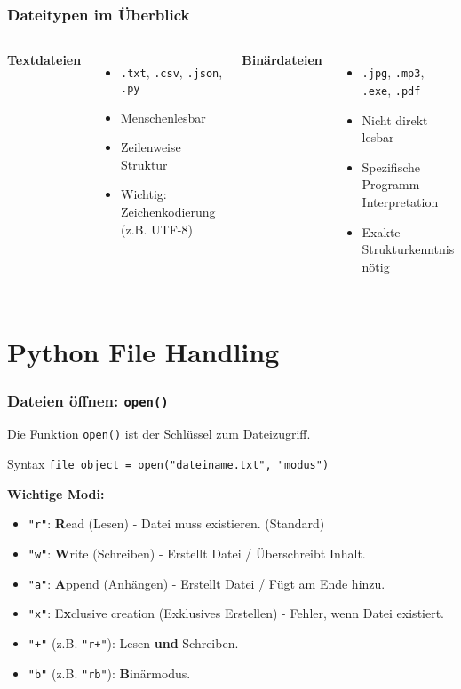 \documentclass[aspectratio=169]{beamer} %
\begin{document}
\begin{frame}[fragile]
\frametitle{Dateitypen im Überblick}
\begin{columns}[T] %
    \textbf{Textdateien}
    \begin{itemize}
        \item \texttt{.txt}, \texttt{.csv}, \texttt{.json}, \texttt{.py}
        \item Menschenlesbar
        \item Zeilenweise Struktur
        \item Wichtig: Zeichenkodierung (z.B. UTF-8)
    \end{itemize}
    \textbf{Binärdateien}
    \begin{itemize}
        \item \texttt{.jpg}, \texttt{.mp3}, \texttt{.exe}, \texttt{.pdf}
        \item Nicht direkt lesbar
        \item Spezifische Programm-Interpretation
        \item Exakte Strukturkenntnis nötig
    \end{itemize}
\end{columns}
\end{frame}

\section{Python File Handling}

\begin{frame}[fragile]
\frametitle{Dateien öffnen: \texttt{open()}}
Die Funktion \texttt{open()} ist der Schlüssel zum Dateizugriff.

\begin{block}{Syntax}
\texttt{file\_object = open("dateiname.txt", "modus")}
\end{block}
\textbf{Wichtige Modi:}
\begin{itemize}
    \item \texttt{"r"}: \textbf{R}ead (Lesen) - Datei muss existieren. (Standard)
    \item \texttt{"w"}: \textbf{W}rite (Schreiben) - Erstellt Datei / Überschreibt Inhalt.
    \item \texttt{"a"}: \textbf{A}ppend (Anhängen) - Erstellt Datei / Fügt am Ende hinzu.
    \item \texttt{"x"}: E\textbf{x}clusive creation (Exklusives Erstellen) - Fehler, wenn Datei existiert.
    \item \texttt{"+"} (z.B. \texttt{"r+"}): Lesen \textbf{und} Schreiben.
    \item \texttt{"b"} (z.B. \texttt{"rb"}): \textbf{B}inärmodus.
\end{itemize}
\end{frame}
\end{document}
